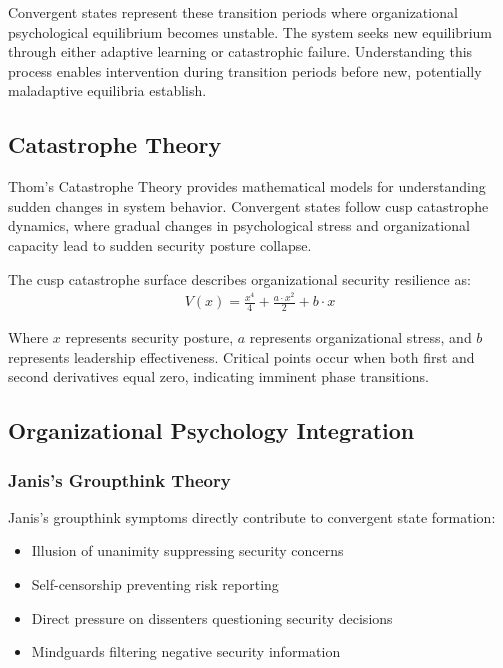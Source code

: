 \documentclass[11pt,a4paper]{article}
\begin{document}
Convergent states represent these transition periods where organizational psychological equilibrium becomes unstable. The system seeks new equilibrium through either adaptive learning or catastrophic failure. Understanding this process enables intervention during transition periods before new, potentially maladaptive equilibria establish.

\subsection{Catastrophe Theory}

Thom's\cite{thom1975} Catastrophe Theory provides mathematical models for understanding sudden changes in system behavior. Convergent states follow cusp catastrophe dynamics, where gradual changes in psychological stress and organizational capacity lead to sudden security posture collapse.

The cusp catastrophe surface describes organizational security resilience as:
\begin{align}
V(x) = \frac{x^4}{4} + \frac{a \cdot x^2}{2} + b \cdot x
\end{align}

Where $x$ represents security posture, $a$ represents organizational stress, and $b$ represents leadership effectiveness. Critical points occur when both first and second derivatives equal zero, indicating imminent phase transitions.

\subsection{Organizational Psychology Integration}

\subsubsection{Janis's Groupthink Theory}

Janis's\cite{janis1971} groupthink symptoms directly contribute to convergent state formation:
\begin{itemize}
\item Illusion of unanimity suppressing security concerns
\item Self-censorship preventing risk reporting
\item Direct pressure on dissenters questioning security decisions
\item Mindguards filtering negative security information
\end{itemize}
\end{document}
